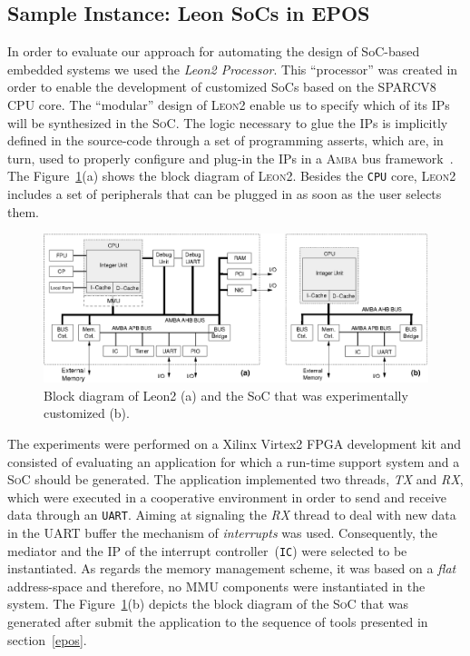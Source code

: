 \documentclass{kapproc} %
\begin{document}

\subsection{Sample Instance: Leon SoCs in EPOS}

 In order to evaluate our approach for automating the design of
 SoC-based embedded systems we used the \emph{Leon2 Processor}. This
 ``processor'' was created in order to enable the development of
 customized SoCs based on the SPARCV8 CPU core. The ``modular'' design
 of \textsc{Leon2} enable us to specify which of its \textsc{IP}s will
 be synthesized in the \textsc{SoC}. The logic necessary to glue the
 \textsc{IP}s is implicitly defined in the source-code through a set
 of programming asserts, which are, in turn, used to properly
 configure and plug-in the \textsc{IP}s in a \textsc{Amba} bus
 framework~\cite{AMBA}. The Figure~\ref{fig:leon2}(a) shows the block
 diagram of \textsc{Leon2}. Besides the \texttt{CPU} core,
 \textsc{Leon2} includes a set of peripherals that can be plugged in
 as soon as the user selects them.

\begin{figure}{
\centering
\includegraphics[width=1.0\linewidth]{leon2.eps}\par}
\caption{Block diagram of Leon2 (a) and the SoC that was experimentally 
customized (b).}
\label{fig:leon2}
\end{figure}

 The experiments were performed on a Xilinx Virtex2 FPGA development
 kit and consisted of evaluating an application for which a run-time
 support system and a \textsc{SoC} should be generated. The
 application implemented two threads, \emph{TX} and \emph{RX}, which
 were executed in a cooperative environment in order to send and
 receive data through an \texttt{UART}. Aiming at signaling the
 \emph{RX} thread to deal with new data in the \textsc{UART} buffer
 the mechanism of \emph{interrupts} was used. Consequently, the
 mediator and the \textsc{IP} of the interrupt
 controller~(\texttt{IC}) were selected to be instantiated. As regards
 the memory management scheme, it was based on a \emph{flat}
 address-space and therefore, no \textsc{MMU} components were
 instantiated in the system. The Figure~\ref{fig:leon2}(b) depicts the
 block diagram of the \textsc{SoC} that was generated after submit the
 application to the sequence of tools presented in section~\ref{epos}.
\end{document}
